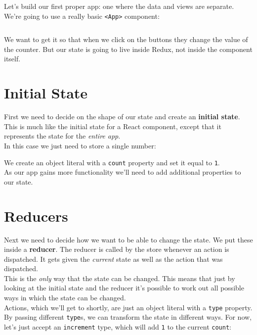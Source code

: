 \hr

Let's build our first proper app: one where the data and views are separate. We're going to use a really basic \texttt{<App>} component:

\inputminted{jsx}{01/figures/02/01-App.jsx}

We want to get it so that when we click on the buttons they change the value of the counter. But our state is going to live inside Redux, not inside the component itself.


\section{Initial State}

First we need to decide on the shape of our state and create an \textbf{initial state}. This is much like the initial state for a React component, except that it represents the state for the \textit{entire app}.
\\

In this case we just need to store a single number:


We create an object literal with a \texttt{count} property and set it equal to \texttt{1}.
\\

As our app gains more functionality we'll need to add additional properties to our state.



\section{Reducers}

Next we need to decide how we want to be able to change the state. We put these inside a \textbf{reducer}. The reducer is called by the store whenever an action is dispatched. It gets given the \textit{current} state as well as the action that was dispatched.
\\

This is the \textit{only} way that the state can be changed. This means that just by looking at the initial state and the reducer it's possible to work out all possible ways in which the state can be changed.
\\

Actions, which we'll get to shortly, are just an object literal with a \texttt{type} property. By passing different \texttt{type}s, we can transform the state in different ways. For now, let's just accept an \texttt{increment} type, which will add \texttt{1} to the current \texttt{count}:

